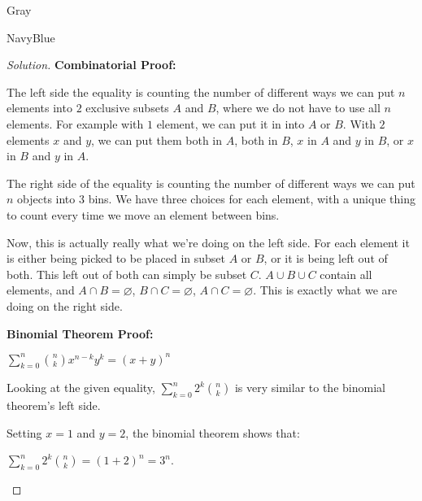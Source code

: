 \documentclass[12pt]{amsart}
\theoremstyle{named}
\newenvironment{soln}
{\begin{color}{Gray}\begin{framed}\begin{color}{NavyBlue}\begin{proof}[Solution]
\doublespacing}
{\end{proof}\end{color}\end{framed}\end{color}}
\theoremstyle{definition}
\begin{document}
\begin{soln}
    \phantom{ }

    \textbf{Combinatorial Proof:}

    \begin{adjustwidth}{2em}{0em}
        \noindent The left side the equality is counting the number of different ways we can 
        put $n$ elements into $2$ exclusive subsets $A$ and $B$, where we do not have to use all $n$ elements.
        For example with $1$ element, we can put it in into $A$ or $B$. With $2$ elements $x$ and $y$,
        we can put them both in $A$, both in $B$, $x$ in $A$ and $y$ in $B$, or $x$ in $B$ and $y$ in $A$.

        \phantom{ }

        \noindent The right side of the equality is counting
        the number of different ways we can put $n$ objects into $3$ bins. We have three choices
        for each element, with a unique thing to count every time we move an element between bins.

        \phantom{ }

        \noindent Now, this is actually really what we're doing on the left side. For each element
        it is either being picked to be placed in subset $A$ or $B$, or it is being left out of both.
        This left out of both can simply be subset $C$. $A \cup B \cup C$ contain all elements, and
        $A \cap B = \varnothing$, $B \cap C = \varnothing$, $A \cap C = \varnothing$. This is
        exactly what we are doing on the right side. 
    \end{adjustwidth}

    \phantom{ }

    \textbf{Binomial Theorem Proof:}

    \begin{adjustwidth}{2em}{0em}
        $\displaystyle\sum_{k = 0}^{n} {n \choose k} x^{n-k}y^k = (x + y)^n$

        \phantom{ }

        \noindent Looking at the given equality, $\displaystyle \sum_{k=0}^n2^k{n\choose k}$ is
        very similar to the binomial theorem's left side. 
        
        \noindent Setting $x = 1$ and $y = 2$, the binomial theorem shows that:

        \noindent $\displaystyle\sum_{k = 0}^{n} 2^k {n \choose k} = (1 + 2)^n = 3^n$.
    \end{adjustwidth}

\end{soln}

\end{document}
